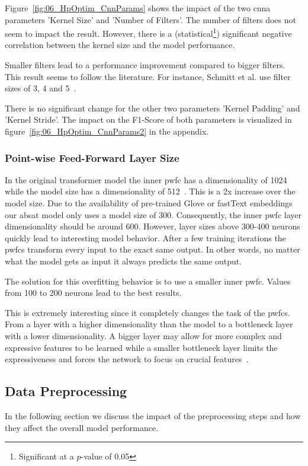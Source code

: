 Figure~\ref{fig:06_HpOptim_CnnParams} shows the impact of the two \gls{cnna} parameters 'Kernel Size' and 'Number of Filters'. The number of filters does not seem to impact the result. However, there is a {(statistical\footnote{Significant at a $p$-value of 0.05})} significant negative correlation between the kernel size and the model performance. 

Smaller filters lead to a performance improvement compared to bigger filters. This result seems to follow the literature. For instance, Schmitt et al. use filter sizes of 3, 4 and 5~\cite{Schmitt2018}.
\medskip

There is no significant change for the other two parameters 'Kernel Padding' and 'Kernel Stride'. The impact on the F1-Score of both parameters is visualized in figure~\ref{fig:06_HpOptim_CnnParams2} in the appendix.

\subsubsection{Point-wise Feed-Forward Layer Size}

In the original transformer model the inner \acrfull{pwfc} has a dimensionality of 1024 while the model size has a dimensionality of 512~\cite{Vaswani2017c}. This is a 2x increase over the model size. Due to the availability of pre-trained Glove or fastText embeddings our \gls{absat} model only uses a model size of 300. Consequently, the inner \gls{pwfc} layer dimensionality should be around 600. However, layer sizes above 300-400 neurons quickly lead to interesting model behavior. After a few training iterations the \glspl{pwfc} transform every input to the exact same output. In other words, no matter what the model gets as input it always predicts the same output.
\medskip

The solution for this overfitting behavior is to use a smaller inner \gls{pwfc}. Values from 100 to 200 neurons lead to the best results.

This is extremely interesting since it completely changes the task of the \glspl{pwfc}. From a layer with a higher dimensionality than the model to a bottleneck layer with a lower dimensionality. A bigger layer may allow for more complex and expressive features to be learned while a smaller bottleneck layer limits the expressiveness and forces the network to focus on crucial features~\cite{Ramsundar2015}.

\subsection{Data Preprocessing}
\label{subsec:06_dataPreprocessing}
In the following section we discuss the impact of the preprocessing steps and how they affect the overall model performance. 

